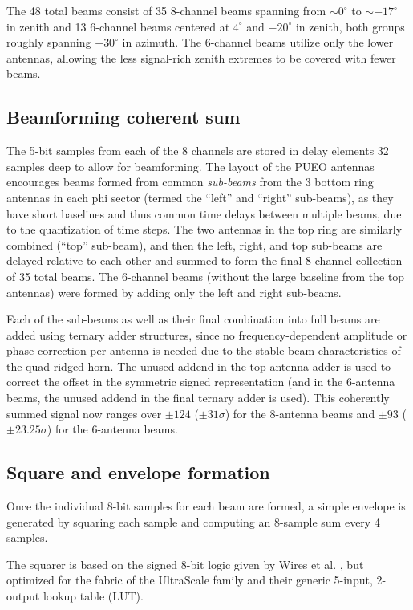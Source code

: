 \documentclass{IEEEtran}
\begin{document}
The 48 total beams consist of 35 8-channel beams spanning from 
$\sim0^\circ$ to $\sim-17^\circ$ in zenith and 13 6-channel beams 
centered at $4^{\circ}$ and $-20^{\circ}$ in zenith, both groups
roughly spanning $\pm30^{\circ}$ in azimuth. The 6-channel beams
utilize only the lower antennas, allowing the less signal-rich
zenith extremes to be covered with fewer beams.

\subsection{Beamforming coherent sum}

The 5-bit samples from each of the 8 channels are stored in delay elements
32 samples deep to allow for beamforming. The layout of the
PUEO antennas encourages beams formed from common \emph{sub-beams}
from the 3 bottom ring antennas in each phi sector (termed the
``left'' and ``right'' sub-beams), as they have short baselines
and thus common time delays between multiple beams, due to the 
quantization of time steps. The two antennas in the
top ring are similarly combined (``top'' sub-beam), and then the
left, right, and top sub-beams are delayed relative to each other
and summed to form the final 8-channel collection of 35 total beams.
The 6-channel beams (without the large baseline from the top antennas)
were formed by adding only the left and right sub-beams.

Each of the sub-beams as well as their final combination into full
beams are added using ternary adder structures, since no 
frequency-dependent amplitude or phase correction per antenna is needed due to
the stable beam characteristics of the quad-ridged horn. The unused
addend in the top antenna adder is used to correct the offset in the
symmetric signed representation (and in the 6-antenna beams, the unused
addend in the final ternary adder is used). This coherently
summed signal now ranges over $\pm124$ ($\pm31\sigma$) for the 
8-antenna beams and $\pm93$ ($\pm23.25\sigma$) for the 6-antenna beams.

\subsection{Square and envelope formation}

Once the individual 8-bit samples for each beam are formed,
a simple envelope is generated by squaring each sample
and computing an 8-sample sum every 4 samples.

The squarer is based on the signed 8-bit logic given by 
Wires et al. \cite{wires831900}, but optimized for the
fabric of the UltraScale family and their generic 5-input,
2-output lookup table (LUT).
\end{document}
